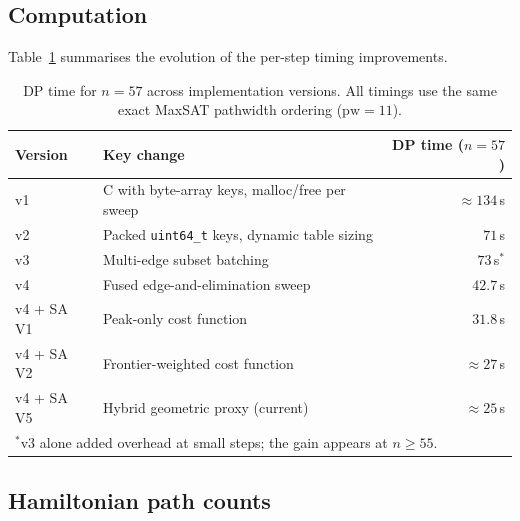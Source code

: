 \documentclass[12pt]{article}
\theoremstyle{definition}
\newcommand{\pw}{\mathrm{pw}}
\begin{document}
\subsection{Computation}

Table~\ref{tab:results} summarises the evolution of the per-step timing
improvements.

\begin{table}[H]
\centering
\caption{DP time for $n = 57$ across implementation versions.
All timings use the same exact MaxSAT pathwidth ordering ($\pw = 11$).}
\label{tab:results}
\begin{tabular}{llr}
\toprule
Version & Key change & DP time ($n=57$)\\
\midrule
v1 & C with byte-array keys, malloc/free per sweep & $\approx 134$\,s\\
v2 & Packed \texttt{uint64\_t} keys, dynamic table sizing & $71$\,s\\
v3 & Multi-edge subset batching & $73$\,s$^*$\\
v4 & Fused edge-and-elimination sweep & $42.7$\,s\\
v4 + SA V1 & Peak-only cost function & $31.8$\,s\\
v4 + SA V2 & Frontier-weighted cost function & $\approx 27$\,s\\
v4 + SA V5 & Hybrid geometric proxy (current) & $\approx 25$\,s\\
\bottomrule
\multicolumn{3}{l}{$^*$v3 alone added overhead at small steps; the gain appears at $n \ge 55$.}
\end{tabular}
\end{table}

\subsection{Hamiltonian path counts}
\end{document}
